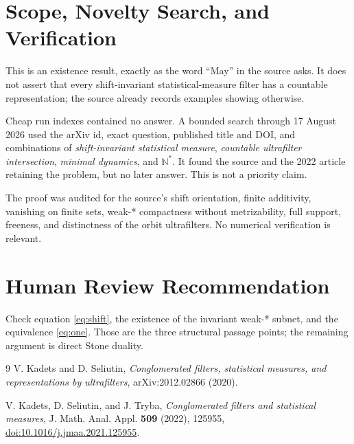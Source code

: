 \documentclass[11pt]{article}
\newcommand{\N}{\mathbb N}
\begin{document}
\section*{Scope, Novelty Search, and Verification}

This is an existence result, exactly as the word ``May'' in the source
asks.  It does not assert that every shift-invariant statistical-measure
filter has a countable representation; the source already records examples
showing otherwise.

Cheap run indexes contained no answer.  A bounded search through
17 August 2026 used the arXiv id, exact question, published title and DOI,
and combinations of \emph{shift-invariant statistical measure},
\emph{countable ultrafilter intersection}, \emph{minimal dynamics}, and
$\N^*$.  It found the source and the 2022 article retaining the problem,
but no later answer.  This is not a priority claim.

The proof was audited for the source's shift orientation, finite
additivity, vanishing on finite sets, weak-* compactness without
metrizability, full support, freeness, and distinctness of the orbit
ultrafilters.  No numerical verification is relevant.

\section*{Human Review Recommendation}

Check equation \eqref{eq:shift}, the existence of the invariant weak-* subnet,
and the equivalence \eqref{eq:one}.  Those are the three structural passage
points; the remaining argument is direct Stone duality.

\begin{thebibliography}{9}
\small
{}
V. Kadets and D. Seliutin,
\emph{Conglomerated filters, statistical measures, and representations by
ultrafilters}, arXiv:2012.02866 (2020).

V. Kadets, D. Seliutin, and J. Tryba,
\emph{Conglomerated filters and statistical measures},
J. Math. Anal. Appl. \textbf{509} (2022), 125955,
\href{https://doi.org/10.1016/j.jmaa.2021.125955}{doi:10.1016/j.jmaa.2021.125955}.
\end{thebibliography}
\end{document}
